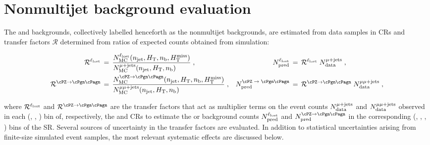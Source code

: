 
\section{Nonmultijet background evaluation}
\label{sec:ewk}

The \lost and \znunuj backgrounds, collectively labelled henceforth as
the nonmultijet backgrounds, are estimated from data samples in CRs
and transfer factors $\mathcal{R}$ determined from ratios of expected
counts obtained from simulation:

\begin{align}
  \tf^{\lost} \, & = \,
  \frac{N^{\lost}_\text{MC}(\njet, \scalht, \nb, \mht)}
  {N^{\mj}_\text{MC}(\njet, \scalht, \nb)\hfill} \; ,
  & 
  N^{\lost}_\text{pred} \, & = \,
  \tf^{\lost} \; N^{\mj}_\text{data} \; ,
  \\
  \tf^{\znunu} \, & = \,
  \frac{N^{\znunu}_\text{MC}(\njet, \scalht, \nb, \mht)}
  {N^{\mmj}_\text{MC}(\njet, \scalht, \nb)\hfill} \; ,
  & 
  N^\text{\znunu}_\text{pred} \, & = \,
  \tf^{\znunu} \; N^{\mmj}_\text{data} \; ,
\end{align}

where $\mathcal{R}^{\ell_\text{lost}}$ and $\tf^{\znunu}$ are the transfer factors that
act as multiplier terms on the event counts $N^{\mu + \text{jets}}_\text{data}$ and
$N^{\mu\mu + \text{jets}}_\text{data}$ observed in each (\njet, \scalht, \nb) bin of,
respectively, the \mj and \mmj CRs to estimate the \lost or \znunuj
background counts $N^{\ell_\text{lost}}_\text{pred}$ and $N^{\znunu}_\text{pred}$
in the corresponding (\njet, \scalht, \nb, \mht) bins of the SR. 
Several sources of uncertainty in the transfer factors are evaluated.
In addition to statistical uncertainties arising from finite-size
simulated event samples, the most relevant systematic effects are
discussed below.


